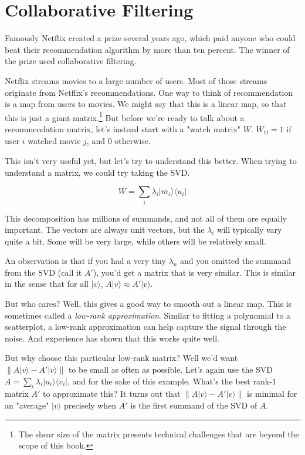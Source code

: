 \documentclass{amsbook}
\begin{document}
\section{Collaborative Filtering}

Famously Netflix created a prize several years ago, which paid anyone who could beat their recommendation algorithm by more than ten percent.  The winner of the prize used collaborative filtering.

Netflix streams movies to a large number of users.  Most of those streams originate from Netflix's recommendations.  One way to think of recommendation is a map from users to movies.  We might say that this is a linear map, so that this is just a giant matrix.\footnote{The shear size of the matrix presents technical challenges that are beyond the scope of this book.}  But before we're ready to talk about a recommendation matrix, let's instead start with a "watch matrix" $W$.  $W_{ij}=1$ if user $i$ watched movie $j$, and $0$ otherwise.

This isn't very useful yet, but let's try to understand this better.  When trying to understand a matrix, we could try taking the SVD.

$$
W=\sum_i\lambda_i|m_i\rangle\langle u_i|
$$

This decomposition has millions of summands, and not all of them are equally important.  The vectors are always unit vectors, but the $\lambda_i$ will typically vary quite a bit.  Some will be very large, while others will be relatively small.

An observation is that if you had a very tiny $\lambda_n$ and you omitted the summand from the SVD (call it $A'$), you'd get a matrix that is very similar.  This is similar in the sense that for all $|v\rangle$, $A|v\rangle\approx A'|v\rangle$.

But who cares?  Well, this gives a good way to smooth out a linear map.  This is sometimes called a {\em low-rank approximation}.  Similar to fitting a polynomial to a scatterplot, a low-rank approximation can help capture the signal through the noise.  And experience has shown that this works quite well.

But why choose this particular low-rank matrix?  Well we'd want $\left\|A|v\rangle-A'|v\rangle\right\|$ to be small as often as possible.  Let's again use the SVD $A=\sum_i\lambda_i|u_i\rangle\langle v_i|$, and for the sake of this example.  What's the best rank-$1$ matrix $A'$ to approximate this?  It turns out that $\left\|A|v\rangle-A'|v\rangle\right\|$ is minimal for an "average" $|v\rangle$ precisely when $A'$ is the first summand of the SVD of $A$.
\end{document}

